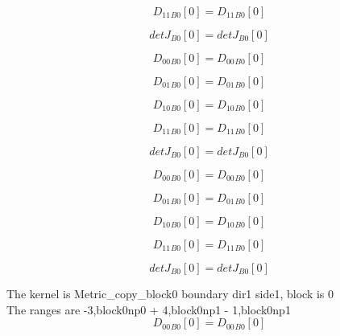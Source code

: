 \documentclass{article}
\begin{document}
\begin{dmath}{D_{11}{_{B0}}}[{0}] = {D_{11}{_{B0}}}[{0}]\end{dmath}

\begin{dmath}{detJ{_{B0}}}[{0}] = {detJ{_{B0}}}[{0}]\end{dmath}

\begin{dmath}{D_{00}{_{B0}}}[{0}] = {D_{00}{_{B0}}}[{0}]\end{dmath}

\begin{dmath}{D_{01}{_{B0}}}[{0}] = {D_{01}{_{B0}}}[{0}]\end{dmath}

\begin{dmath}{D_{10}{_{B0}}}[{0}] = {D_{10}{_{B0}}}[{0}]\end{dmath}

\begin{dmath}{D_{11}{_{B0}}}[{0}] = {D_{11}{_{B0}}}[{0}]\end{dmath}

\begin{dmath}{detJ{_{B0}}}[{0}] = {detJ{_{B0}}}[{0}]\end{dmath}

\begin{dmath}{D_{00}{_{B0}}}[{0}] = {D_{00}{_{B0}}}[{0}]\end{dmath}

\begin{dmath}{D_{01}{_{B0}}}[{0}] = {D_{01}{_{B0}}}[{0}]\end{dmath}

\begin{dmath}{D_{10}{_{B0}}}[{0}] = {D_{10}{_{B0}}}[{0}]\end{dmath}

\begin{dmath}{D_{11}{_{B0}}}[{0}] = {D_{11}{_{B0}}}[{0}]\end{dmath}

\begin{dmath}{detJ{_{B0}}}[{0}] = {detJ{_{B0}}}[{0}]\end{dmath}

\noindent The kernel is Metric_copy_block0 boundary dir1 side1, block is 0\\\noindent The ranges are -3,block0np0 + 4,block0np1 - 1,block0np1\\\begin{dmath}{D_{00}{_{B0}}}[{0}] = {D_{00}{_{B0}}}[{0}]\end{dmath}
\end{document}
